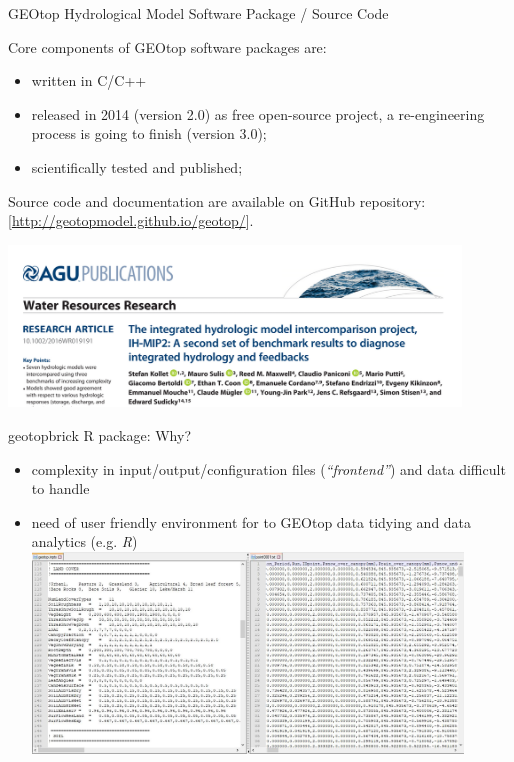 \documentclass[ignorenonframetext,]{beamer}
\providecommand{\tightlist}{%
  \setlength{\itemsep}{0pt}\setlength{\parskip}{0pt}}
\begin{document}
\begin{frame}{GEOtop Hydrological Model Software Package / Source Code}

Core components of GEOtop software packages are:

\begin{itemize}
\tightlist
\item
  written in C/C++
\item
  released in 2014 (version 2.0) as free open-source project, a
  re-engineering process is going to finish (version 3.0);
\item
  scientifically tested and published;
\end{itemize}

Source code and documentation are available on GitHub repository:
{[}\url{http://geotopmodel.github.io/geotop/}{]}.

\includegraphics[width=0.90000\textwidth]{resources/images/geotop_paper_2017.png}\\

\end{frame}

\begin{frame}{geotopbrick R package: Why?}

\begin{itemize}
\tightlist
\item
  complexity in input/output/configuration files (\emph{``frontend''})
  and data difficult to handle
\item
  need of user friendly environment for to GEOtop data tidying and data
  analytics (e.g. \emph{R})
  \includegraphics[width=0.90000\textwidth]{resources/images/Capture_IO_GEOtopJPG.JPG}\\
\end{itemize}

\end{frame}
\end{document}
